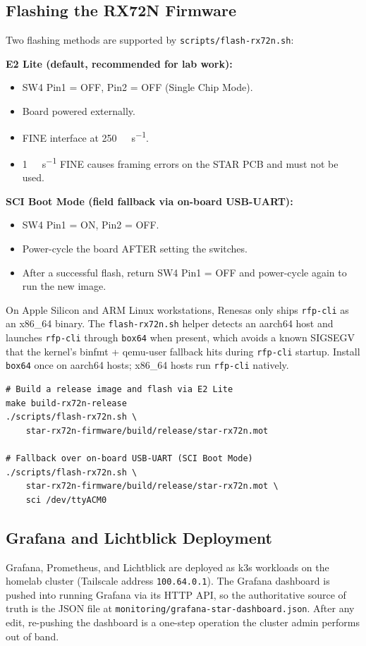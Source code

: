 \documentclass[11pt,letterpaper]{article}
\begin{document}
\subsection{Flashing the RX72N Firmware}
Two flashing methods are supported by \texttt{scripts/flash-rx72n.sh}:

\textbf{E2 Lite (default, recommended for lab work):}
\begin{itemize}[leftmargin=1.4em,itemsep=2pt]
\item SW4 Pin1 = OFF, Pin2 = OFF (Single Chip Mode).
\item Board powered externally.
\item FINE interface at \qty{250}{\kilo\bit\per\second}.
\item \qty{1}{\mega\bit\per\second} FINE causes framing errors on
      the STAR PCB and must not be used.
\end{itemize}

\textbf{SCI Boot Mode (field fallback via on-board USB-UART):}
\begin{itemize}[leftmargin=1.4em,itemsep=2pt]
\item SW4 Pin1 = ON, Pin2 = OFF.
\item Power-cycle the board AFTER setting the switches.
\item After a successful flash, return SW4 Pin1 = OFF and power-cycle
      again to run the new image.
\end{itemize}

On Apple Silicon and ARM Linux workstations, Renesas only ships
\texttt{rfp-cli} as an x86\_64 binary. The
\texttt{flash-rx72n.sh} helper detects an aarch64 host and
launches \texttt{rfp-cli} through \texttt{box64} when present, which
avoids a known SIGSEGV that the kernel's binfmt + qemu-user fallback
hits during \texttt{rfp-cli} startup. Install \texttt{box64} once
on aarch64 hosts; x86\_64 hosts run \texttt{rfp-cli} natively.

\begin{lstlisting}[style=shellcmd]
# Build a release image and flash via E2 Lite
make build-rx72n-release
./scripts/flash-rx72n.sh \
    star-rx72n-firmware/build/release/star-rx72n.mot

# Fallback over on-board USB-UART (SCI Boot Mode)
./scripts/flash-rx72n.sh \
    star-rx72n-firmware/build/release/star-rx72n.mot \
    sci /dev/ttyACM0
\end{lstlisting}

\subsection{Grafana and Lichtblick Deployment}
Grafana, Prometheus, and Lichtblick are deployed as k3s workloads on
the homelab cluster (Tailscale address \texttt{100.64.0.1}). The
Grafana dashboard is pushed into running Grafana via its HTTP API, so
the authoritative source of truth is the JSON file at
\texttt{monitoring/grafana-star-dashboard.json}. After any edit,
re-pushing the dashboard is a one-step operation the cluster admin
performs out of band.
\end{document}
